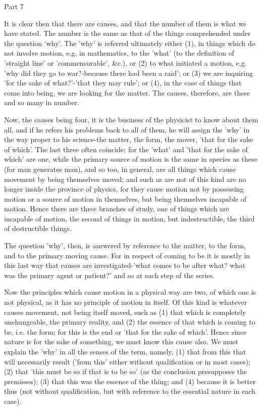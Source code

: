 Part 7

It is clear then that there are causes, and that the number of them
is what we have stated. The number is the same as that of the things
comprehended under the question 'why'. The 'why' is referred ultimately
either (1), in things which do not involve motion, e.g. in mathematics,
to the 'what' (to the definition of 'straight line' or 'commensurable',
&c.), or (2) to what initiated a motion, e.g. 'why did they go to
war?-because there had been a raid'; or (3) we are inquiring 'for
the sake of what?'-'that they may rule'; or (4), in the case of things
that come into being, we are looking for the matter. The causes, therefore,
are these and so many in number. 

Now, the causes being four, it is the business of the physicist to
know about them all, and if he refers his problems back to all of
them, he will assign the 'why' in the way proper to his science-the
matter, the form, the mover, 'that for the sake of which'. The last
three often coincide; for the 'what' and 'that for the sake of which'
are one, while the primary source of motion is the same in species
as these (for man generates man), and so too, in general, are all
things which cause movement by being themselves moved; and such as
are not of this kind are no longer inside the province of physics,
for they cause motion not by possessing motion or a source of motion
in themselves, but being themselves incapable of motion. Hence there
are three branches of study, one of things which are incapable of
motion, the second of things in motion, but indestructible, the third
of destructible things. 

The question 'why', then, is answered by reference to the matter,
to the form, and to the primary moving cause. For in respect of coming
to be it is mostly in this last way that causes are investigated-'what
comes to be after what? what was the primary agent or patient?' and
so at each step of the series. 

Now the principles which cause motion in a physical way are two, of
which one is not physical, as it has no principle of motion in itself.
Of this kind is whatever causes movement, not being itself moved,
such as (1) that which is completely unchangeable, the primary reality,
and (2) the essence of that which is coming to be, i.e. the form;
for this is the end or 'that for the sake of which'. Hence since nature
is for the sake of something, we must know this cause also. We must
explain the 'why' in all the senses of the term, namely, (1) that
from this that will necessarily result ('from this' either without
qualification or in most cases); (2) that 'this must be so if that
is to be so' (as the conclusion presupposes the premisses); (3) that
this was the essence of the thing; and (4) because it is better thus
(not without qualification, but with reference to the essential nature
in each case). 

